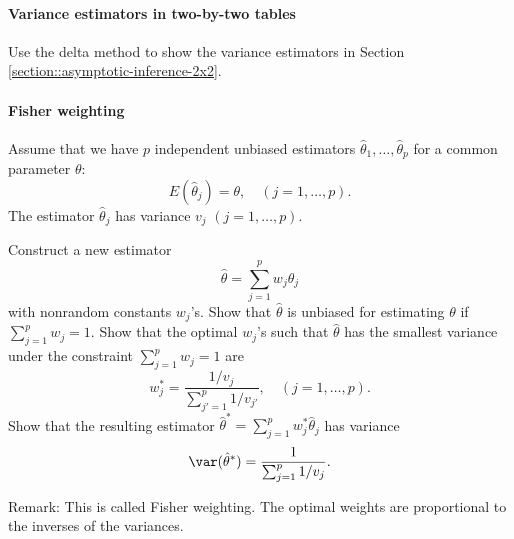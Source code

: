 \paragraph{Variance estimators in two-by-two tables}\label{hw::variance-estimators-2x2}

Use the delta method to show the variance estimators in Section \ref{section::asymptotic-inference-2x2}. 




\paragraph{Fisher weighting}\label{hw::fisher-weighting}


Assume that we have $p$ independent unbiased estimators $\hat{\theta}_1, \ldots, \hat{\theta}_p$ for a common parameter $\theta$:
$$
E(\hat{\theta}_j) = \theta,\quad (j=1,\ldots, p).
$$
The estimator  $\hat{\theta}_j$ has variance $v_j$ $(j=1,\ldots, p)$. 

Construct a new estimator
$$
\hat{\theta} = \sum_{j=1}^p w_j \hat{\theta}_j
$$
with nonrandom constants $w_j$'s. 
Show that $\hat{\theta} $ is unbiased for estimating $\theta$ if $\sum_{j=1}^p w_j = 1$. Show that the optimal $w_j$'s such that $\hat{\theta} $ has the smallest variance under the constraint $\sum_{j=1}^p w_j = 1$ are
$$
w_j^* =  \frac{1/v_j}{ \sum_{j'=1}^p   1/v_{j'} }, \quad (j=1,\ldots, p).
$$
Show that the resulting estimator $\hat{\theta}^* = \sum_{j=1}^p w_j^* \hat{\theta}_j$ has variance
$$
\var(\hat{\theta}^*) =  \frac{1 }{ \sum_{j=1}^p   1/v_{j} }. 
$$


Remark: This is called Fisher weighting. The optimal weights are proportional to the inverses of the variances. 


